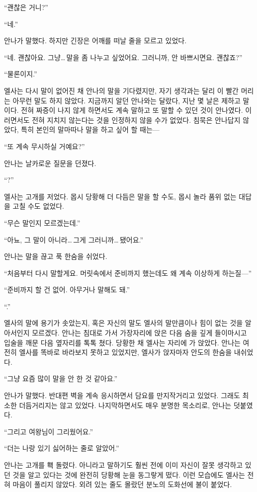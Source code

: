 ``괜찮은 거니?''

``네.''

안나가 말했다. 하지만 긴장은 어깨를 떠날 줄을 모르고 있었다.

``네. 괜찮아요. 그냥\ldots\,말을 좀 나누고 싶었어요. 그러니까, 안 바쁘시면요. 괜찮죠?''

``물론이지.''

엘사는 다시 말이 없어진 채 안나의 말을 기다렸지만, 자기 생각과는 달리 이 빨간 머리는 아무런 말도 하지 않았다. 지금까지 알던 안나와는 달랐다, 지난 몇 날은 제하고 말이다. 전혀 짜증이 나지 않게 하면서도 계속 말하고 또 말할 수 있던 것이 안나였다. 이러면서도 전혀 지치지 않는다는 것을 인정하지 않을 수가 없었다. 침묵은 안나답지 않았다, 특히 본인의 말마따나 말을 하고 싶어 할 때는—

``또 계속 무시하실 거예요?''

안나는 날카로운 질문을 던졌다.

``?''

엘사는 고개를 저었다. 몹시 당황해 더 다듬은 말을 할 수도, 몹시 놀라 품위 없는 대답을 고칠 수도 없었다.

``무슨 말인지 모르겠는데.''

``아뇨, 그 말이 아니라\ldots\,그게 그러니까\ldots\,됐어요.''

안나는 말을 끊고 푹 한숨을 쉬었다.

``처음부터 다시 말할게요. 머릿속에서 준비까지 했는데도 왜 계속 이상하게 하는질—''

``준비까지 할 건 없어. 아무거나 말해도 돼.''

``.''

엘사의 말에 용기가 솟았는지, 혹은 자신의 말도 엘사의 말만큼이나 힘이 없는 것을 알아서인지 모르겠다. 안나는 침대로 가서 가장자리에 앉은 다음 숨을 깊게 들이마시고 입술을 깨문 다음 옆자리를 톡톡 쳤다. 당황한 채 엘사는 자리에 가 앉았다. 안나는 여전히 엘사를 똑바로 바라보지 못하고 있었지만, 엘사가 앉자마자 안도의 한숨을 내쉬었다.

``그냥 요즘 많이 말을 안 한 것 같아요.''

안나가 말했다. 반대편 벽을 계속 응시하면서 담요를 만지작거리고 있었다. 그래도 최소한 더듬거리지는 않고 있었다. 나지막하면서도 매우 분명한 목소리로, 안나는 덧붙였다.

``그리고 여왕님이 그리웠어요.''

``더는 나랑 있기 싫어하는 줄로 알았어.''

안나는 고개를 홱 돌렸다. 아니라고 말하기도 훨씬 전에 이미 자신이 잘못 생각하고 있던 것을 알고 있다는 것에 완전히 당황해 눈을 동그랗게 떴다. 이런 모습에도 엘사는 전혀 마음이 풀리지 않았다. 외려 있는 줄도 몰랐던 분노의 도화선에 불이 붙었다.

